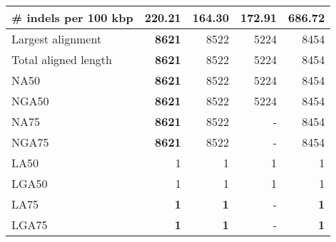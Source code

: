 \documentclass[12pt,a4paper]{article}
\begin{document}
\begin{table}[ht]
\begin{center}
\begin{tabular}{|l*{4}{|r}|}
\# indels per 100 kbp & 220.21 & {\bf 164.30} & 172.91 & 686.72 \\ \hline
Largest alignment & {\bf 8621} & 8522 & 5224 & 8454 \\ \hline
Total aligned length & {\bf 8621} & 8522 & 5224 & 8454 \\ \hline
NA50 & {\bf 8621} & 8522 & 5224 & 8454 \\ \hline
NGA50 & {\bf 8621} & 8522 & 5224 & 8454 \\ \hline
NA75 & {\bf 8621} & 8522 & - & 8454 \\ \hline
NGA75 & {\bf 8621} & 8522 & - & 8454 \\ \hline
LA50 & 1 & 1 & 1 & 1 \\ \hline
LGA50 & 1 & 1 & 1 & 1 \\ \hline
LA75 & {\bf 1} & {\bf 1} & - & {\bf 1} \\ \hline
LGA75 & {\bf 1} & {\bf 1} & - & {\bf 1} \\ \hline
\end{tabular}
\end{center}
\end{table}
\end{document}
